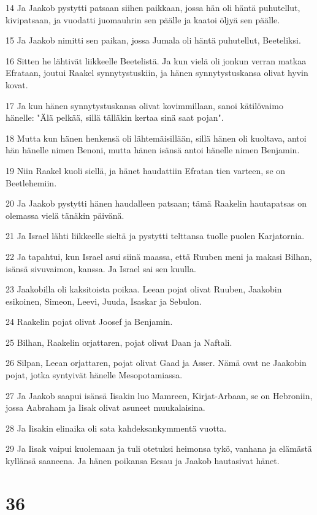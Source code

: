 \par 14 Ja Jaakob pystytti patsaan siihen paikkaan, jossa hän oli häntä puhutellut, kivipatsaan, ja vuodatti juomauhrin sen päälle ja kaatoi öljyä sen päälle.
\par 15 Ja Jaakob nimitti sen paikan, jossa Jumala oli häntä puhutellut, Beeteliksi.
\par 16 Sitten he lähtivät liikkeelle Beetelistä. Ja kun vielä oli jonkun verran matkaa Efrataan, joutui Raakel synnytystuskiin, ja hänen synnytystuskansa olivat hyvin kovat.
\par 17 Ja kun hänen synnytystuskansa olivat kovimmillaan, sanoi kätilövaimo hänelle: "Älä pelkää, sillä tälläkin kertaa sinä saat pojan".
\par 18 Mutta kun hänen henkensä oli lähtemäisillään, sillä hänen oli kuoltava, antoi hän hänelle nimen Benoni, mutta hänen isänsä antoi hänelle nimen Benjamin.
\par 19 Niin Raakel kuoli siellä, ja hänet haudattiin Efratan tien varteen, se on Beetlehemiin.
\par 20 Ja Jaakob pystytti hänen haudalleen patsaan; tämä Raakelin hautapatsas on olemassa vielä tänäkin päivänä.
\par 21 Ja Israel lähti liikkeelle sieltä ja pystytti telttansa tuolle puolen Karjatornia.
\par 22 Ja tapahtui, kun Israel asui siinä maassa, että Ruuben meni ja makasi Bilhan, isänsä sivuvaimon, kanssa. Ja Israel sai sen kuulla.
\par 23 Jaakobilla oli kaksitoista poikaa. Leean pojat olivat Ruuben, Jaakobin esikoinen, Simeon, Leevi, Juuda, Isaskar ja Sebulon.
\par 24 Raakelin pojat olivat Joosef ja Benjamin.
\par 25 Bilhan, Raakelin orjattaren, pojat olivat Daan ja Naftali.
\par 26 Silpan, Leean orjattaren, pojat olivat Gaad ja Asser. Nämä ovat ne Jaakobin pojat, jotka syntyivät hänelle Mesopotamiassa.
\par 27 Ja Jaakob saapui isänsä Iisakin luo Mamreen, Kirjat-Arbaan, se on Hebroniin, jossa Aabraham ja Iisak olivat asuneet muukalaisina.
\par 28 Ja Iisakin elinaika oli sata kahdeksankymmentä vuotta.
\par 29 Ja Iisak vaipui kuolemaan ja tuli otetuksi heimonsa tykö, vanhana ja elämästä kyllänsä saaneena. Ja hänen poikansa Eesau ja Jaakob hautasivat hänet.

\chapter{36}

